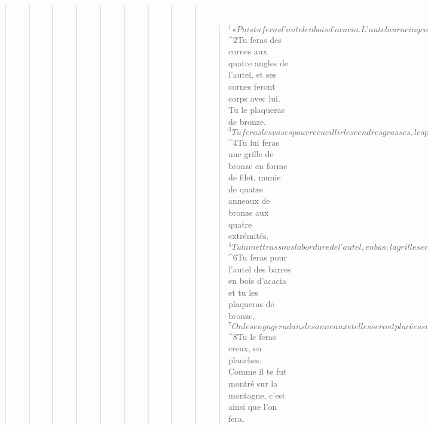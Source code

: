 \begin{verse}
\begin{verse}
\begin{verse}
\begin{verse}
\begin{verse}
\begin{verse}
\begin{verse}
\begin{verse}
\begin{verse}
         
      \bchapter{}
      \begin{verse}
${}^{1}« Puis tu feras l’autel en bois d’acacia. L’autel aura cinq coudées de long, cinq coudées de large – sa base sera donc carrée – et trois coudées de haut. 
${}^{2}Tu feras des cornes aux quatre angles de l’autel, et ses cornes feront corps avec lui. Tu le plaqueras de bronze. 
${}^{3}Tu feras les vases pour recueillir les cendres grasses, les pelles, les bols pour l’aspersion, les fourchettes et les brûle-parfums : tous ces accessoires, tu les feras en bronze. 
${}^{4}Tu lui feras une grille de bronze en forme de filet, munie de quatre anneaux de bronze aux quatre extrémités. 
${}^{5}Tu la mettras sous la bordure de l’autel, en bas ; la grille sera à mi-hauteur de l’autel. 
${}^{6}Tu feras pour l’autel des barres en bois d’acacia et tu les plaqueras de bronze. 
${}^{7}On les engagera dans les anneaux et elles seront placées sur les deux côtés de l’autel pour le porter. 
${}^{8}Tu le feras creux, en planches. Comme il te fut montré sur la montagne, c’est ainsi que l’on fera.
      

\end{verse}
\end{verse}
\end{verse}
\end{verse}
\end{verse}
\end{verse}
\end{verse}
\end{verse}
\end{verse}
\end{verse}
